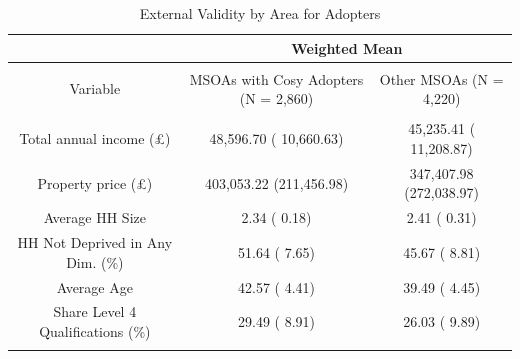 
\begin{table}[!htbp] \centering 
  \caption{External Validity by Area for Adopters} 
  \label{tab:msoa-stats-cosy} 
\begin{tabular}{@{\extracolsep{5pt}} ccc} 
\\[-1.8ex]\hline\hline 
 & \multicolumn{2}{c}{Weighted Mean} \\
\hline \\[-1.8ex] 
Variable & MSOAs with Cosy Adopters (N = 2,860) & Other MSOAs (N = 4,220) \\ 
\hline \\[-1.8ex] 
Total annual income (£) &  48,596.70 ( 10,660.63) &  45,235.41 ( 11,208.87) \\ 
Property price (£) & 403,053.22 (211,456.98) & 347,407.98 (272,038.97) \\ 
Average HH Size &       2.34 (      0.18) &       2.41 (      0.31) \\ 
HH Not Deprived in Any Dim. (\%) &      51.64 (      7.65) &      45.67 (      8.81) \\ 
Average Age &      42.57 (      4.41) &      39.49 (      4.45) \\ 
Share Level 4 Qualifications (\%) &      29.49 (      8.91) &      26.03 (      9.89) \\ 
\hline\hline \\[-1.8ex] 
\end{tabular} 
\end{table} 
